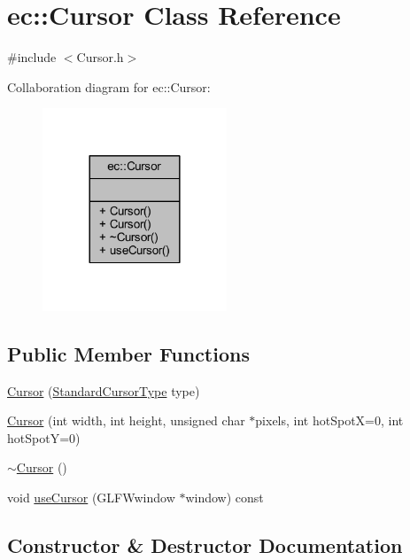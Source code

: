 \hypertarget{classec_1_1_cursor}{}\section{ec\+:\+:Cursor Class Reference}
\label{classec_1_1_cursor}


{\ttfamily \#include $<$Cursor.\+h$>$}



Collaboration diagram for ec\+:\+:Cursor\+:\nopagebreak
\begin{figure}[H]
\begin{center}
\leavevmode
\includegraphics[width=156pt]{classec_1_1_cursor__coll__graph}
\end{center}
\end{figure}
\subsection*{Public Member Functions}
\begin{DoxyCompactItemize}
\item 
\mbox{\hyperlink{classec_1_1_cursor_a7fd103f9e129b2952484999510d8576a}{Cursor}} (\mbox{\hyperlink{namespaceec_a067d7854be2a4a8167831d52a7224e05}{Standard\+Cursor\+Type}} type)
\item 
\mbox{\hyperlink{classec_1_1_cursor_adcbabc67fe488264ee580bcae53de8df}{Cursor}} (int width, int height, unsigned char $\ast$pixels, int hot\+SpotX=0, int hot\+SpotY=0)
\item 
\mbox{\hyperlink{classec_1_1_cursor_a4617172c5106164b27ef856df0b078c3}{$\sim$\+Cursor}} ()
\item 
void \mbox{\hyperlink{classec_1_1_cursor_ad99efc837c8f7fb348d2ea7c3bd230d4}{use\+Cursor}} (G\+L\+F\+Wwindow $\ast$window) const
\end{DoxyCompactItemize}


\subsection{Constructor \& Destructor Documentation}
\mbox{\label{classec_1_1_cursor_a7fd103f9e129b2952484999510d8576a}} 
